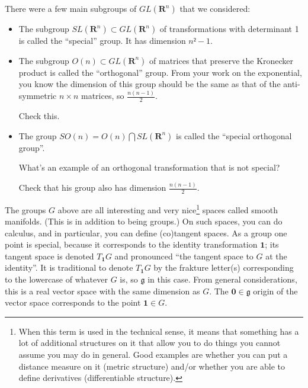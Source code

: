 There were a few main subgroups of $GL(𝐑^n)$ that we considered: 
\begin{itemize}
\item The subgroup $SL(𝐑^n) ⊂ GL(𝐑^n)$ of transformations with determinant 1 is called the “special” group. It has dimension $n² -1$. 
\item The subgroup $O(n) ⊂ GL(𝐑^n)$ of matrices that preserve the Kronecker product is called the “orthogonal” group. From your work on the exponential, you know the dimension of this group should be the same as that of the anti-symmetric $n× n$ matrices, so $\frac {n(n-1)}2$. 
\begin{exercise}
Check this.
\end{exercise}
\item The group $SO(n) = O(n) ⋂ SL(𝐑^n)$ is called the “special orthogonal group”. 
\begin{exercise}
\label{notspecial}
What's an example of an orthogonal transformation that is not special?
\end{exercise}
\begin{exercise}
Check that his group also has dimension $\frac {n(n-1)}2$. 
\end{exercise}
\end{itemize}

The groups $G$ above are all interesting and very nice\footnote{When this term is used in the technical sense, it means that something has a lot of additional structures on it that allow you to do things you cannot assume you may do in general. Good examples are whether you can put a distance measure on it (metric structure) and/or whether you are able to define derivatives (differentiable structure).} spaces called smooth manifolds. (This is in addition to being groups.)  On such spaces, you can do calculus, and in particular, you can define (co)tangent spaces. As a group one point is special, because it corresponds to the identity transformation $𝟏$; its tangent space is denoted $T_𝟏G$ and pronounced “the tangent space to $G$ at the identity”. It is traditional to denote $T_𝟏G$ by the frakture letter(s) corresponding to the lowercase of whatever $G$ is, so $𝔤$ in this case.
From general considerations, this is a real vector space with the same dimension as $G$. The $𝟎∈ 𝔤$ origin of the vector space corresponds to the point $𝟏∈G$. 

